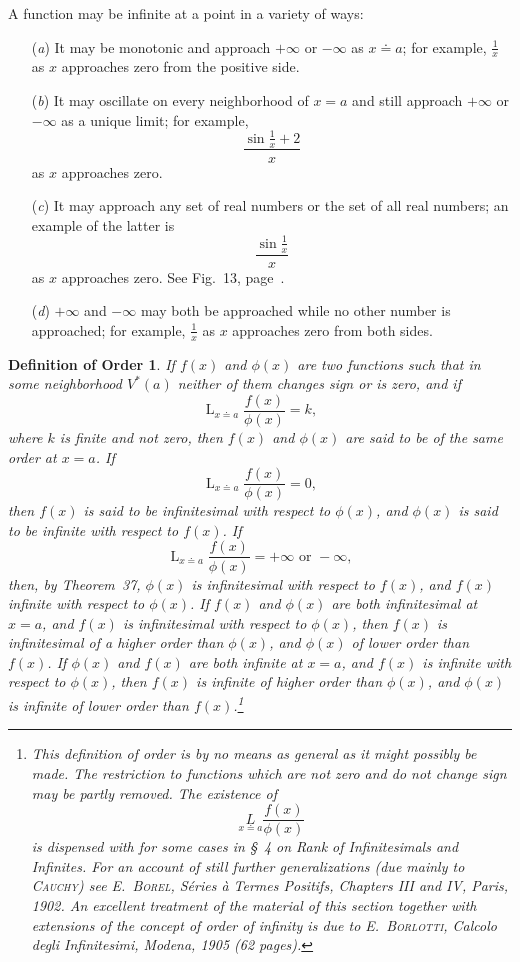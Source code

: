 \documentclass[a4paper,12pt]{book}[2004/02/16]
\providecommand{\colorbox}[2]{#2}
\newcommand{\correction}[2]{\colorbox{corr}{#1}}
\providecommand{\hyperlink}[2]{#2}
\theoremstyle{ilemma}
\theoremstyle{itheorem}
\theoremstyle{iother}
\theoremstyle{icorollary}
\theoremstyle{numcorollary}
\theoremstyle{idefinition}
\newtheorem*{defnorder}{Definition of Order}
\renewcommand{\dfrac}[2]{\frac{#1}{#2}}%
\begin{document}
A function may be infinite at a point in a variety of ways:
\begin{enumerate}
\item[(\textit{a})] It may be monotonic and approach $+\infty$ or
$-\infty$ as $x \doteq a$; for example, $\dfrac{1}{x}$ as $x$
approaches zero from the positive side.
\item[(\textit{b})] It may oscillate on every neighborhood of $x=a$
and still approach $+\infty$ or $-\infty$ as a unique limit; for
example,
\[
  \frac{\sin\dfrac{1}{x}+2}{x}
\]
as $x$ approaches zero.
\item[(\textit{c})] It may approach any set of real numbers or the set
of all real numbers; an example of the latter is
\[
  \frac{\sin\dfrac1x}{x}
\]
as $x$ approaches zero. See Fig.~\hyperlink{fig13}{13}, page~\pageref{fig13}.
\item[(\textit{d})] $+\infty$ and $-\infty$ may both be approached
while no other number is approached; for example,
$\frac1x$ as $x$ approaches zero from both sides.
\end{enumerate}
\begin{defnorder}
If $f(x)$ and $\phi(x)$ are two functions such that in some
neighborhood $V^*(a)$ neither of them changes sign or is zero, and if
\[
  \mathop{L}_{x \doteq a} \frac{f(x)}{\phi(x)} = k,
\]
where $k$ is finite and not zero, then $f(x)$ and $\phi(x)$ are said
to be of the \textit{same order} at $x=a$. If
\[
  \mathop{L}_{x \doteq a} \frac{f(x)}{\phi(x)} = 0,
\]
then $f(x)$ is said to be \textit{infinitesimal with respect to}
$\phi(x)$, and $\phi(x)$ is said to be \textit{infinite with respect
to} $f(x)$. If
\[
  \mathop{L}_{x \doteq a} \frac{f(x)}{\phi(x)} = +\infty \text{ or }-\infty,
\]
then, by Theorem~\hyperlink{thm37}{37}, $\phi(x)$ is infinitesimal with respect to
$f(x)$, and $f(x)$ infinite with respect to $\phi(x)$. If $f(x)$ and
$\phi(x)$ are both infinitesimal at $x=a$, and $f(x)$ is infinitesimal
with respect to $\phi(x)$, then $f(x)$ is infinitesimal of a
\textit{higher order} than $\phi(x)$, and $\phi(x)$ of \textit{lower
order} than $f(x)$. If $\phi(x)$ and $f(x)$ are both infinite at
$x=a$, and $f(x)$ is infinite with respect to $\phi(x)$, then $f(x)$
is
infinite of higher order than $\phi(x)$, and $\phi(x)$ is infinite of
lower order than $f(x)$.\footnote{%
  This definition of order is by no means as general as it might possibly
  be made. The restriction to functions which are not zero and do not change
  sign may be partly removed. The existence of
  \[
    \underset{x\doteq a}L\frac{f(x)}{\phi(x)}
  \]
  is dispensed with for
  some cases in \hyperlink{chVIsec4}{\S~4} on Rank of Infinitesimals and Infinites.  For an
  account of still further generalizations (due mainly to
  \textsc{Cauchy}) see \textsc{E.~Borel}, \textit{S\'eries \correction{\`a}{a} Termes
  Positifs}, Chapters III and IV, Paris, 1902. An excellent treatment
  of the material of this section together with extensions of the
  concept of order of infinity is due to \label{borlottip103}\textsc{E.~Borlotti}, {\it
  Calcolo degli Infinitesimi}, Modena, 1905 (62 pages).}
\end{defnorder}
\end{document}
